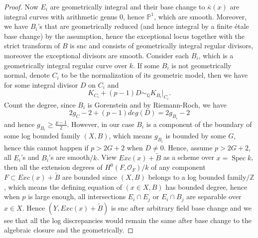 \documentclass[letterpaper,reqno,12pt]{amsart}
\DeclareMathOperator{\Spec}{Spec}
\numberwithin{equation}{section}
\theoremstyle{plain}
\begin{document}
\begin{proof}
    Now $E_i$ are geometrically integral and their base change to $\bar \kappa(x)$ are integral curves with arithmetic genus $0$, hence $\mathbb P^1$, which are smooth. Moreover, we have $B_i$'s that are geometrically reduced (and hence integral by a finite étale base change) by the assumption, hence the exceptional locus together with the strict transform of $B$ is snc and consists of geometrically integral regular divisors, moreover the exceptional divisors are smooth. Consider each $B_i$, which is a geometrically integral regular curve over $k$. If some $B_i$ is not geometrically normal, denote $C_i$ to be the normalization of its geometric model, then we have for some integral divisor $D$ on $C_i$ and\[K_{C_i}+(p-1)D\sim_{\mathbb Q} K_{B_i}|_{C_i}.\] Count the degree, since $B_i$ is Gorenstein and by Riemann-Roch, we have \[2g_C-2+(p-1)deg(D)=2g_{B_i}-2\] and hence $g_{B_i}\geq\frac{p-1}{2}$. However, in our case $B_i$ is a component of the boundary of some log bounded family $(X,B)$, which means $g_{B_i}$ is bounded by some $G$, hence this cannot happen if $p>2G+2$ when $D\neq 0$. Hence,  assume $p>2G+2$, all $E_i$'s and $B_i$'s are smooth$/k$. View $Exc(x)+\tilde B$ as a scheme over $x=\Spec k$, then all the extension degrees of $H^0(F,\mathcal O_F)/k$ of any component $F\subset Exc(x)+\tilde B$ are bounded since $(X,B)$ belongs to a log bounded family$/\mathbb Z$, which means the defining equation of $(x\in X,B)$ has bounded degree, hence when $p$ is large enough, all intersections $E_i\cap E_j$ or $E_i\cap B_j$ are separable over $x\in X$. Hence $(Y,Exc(x)+\tilde B)$  is snc after arbitrary field base change and we see that all the log discrepancies would remain the same after base change to the algebraic closure and the geometrically.
        

\end{proof}
\end{document}

